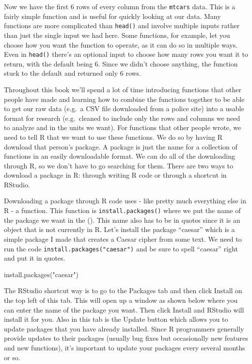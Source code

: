 \documentclass[
]{krantz}
\makeatletter
\newenvironment{Shaded}{\begin{snugshade}}{\end{snugshade}}
\newcommand{\FunctionTok}[1]{\textcolor[rgb]{0,0,0}{#1}}
\newcommand{\NormalTok}[1]{#1}
\newcommand{\StringTok}[1]{\textcolor[rgb]{0.5,0.5,0.5}{#1}}
\newenvironment{kframe}{%
\medskip{}
\setlength{\fboxsep}{.8em}
 \def\at@end@of@kframe{}%
 \ifinner\ifhmode%
  \def\at@end@of@kframe{\end{minipage}}%
  \begin{minipage}{\columnwidth}%
 \fi\fi%
 \def\FrameCommand##1{\hskip\@totalleftmargin \hskip-\fboxsep
 \colorbox{shadecolor}{##1}\hskip-\fboxsep
     \hskip-\linewidth \hskip-\@totalleftmargin \hskip\columnwidth}%
 \MakeFramed {\advance\hsize-\width
   \@totalleftmargin\z@ \linewidth\hsize
   \@setminipage}}%
 {\par\unskip\endMakeFramed%
 \at@end@of@kframe}
\renewenvironment{Shaded}{\begin{kframe}}{\end{kframe}}
\makeatother
\begin{document}
Now we have the first 6 rows of every column from the
\texttt{mtcars} data. This is a fairly simple function and
is useful for quickly looking at our data. Many functions
are more complicated than \texttt{head()} and involve
multiple inputs rather than just the single input we had
here. Some functions, for example, let you choose how you
want the function to operate, as it can do so in multiple
ways. Even in \texttt{head()} there's an optional input to
choose how many rows you want it to return, with the default
being 6. Since we didn't choose anything, the function stuck
to the default and returned only 6 rows.

Throughout this book we'll spend a lot of time introducing
functions that other people have made and learning how to
combine the functions together to be able to get our raw
data (e.g.~a CSV file downloaded from a police site) into a
usable format for research (e.g.~cleaned to include only the
rows and columns we need to analyze and in the units we
want). For functions that other people wrote, we need to
tell R that we want to use these functions. We do so by
having R download that person's package. A package is just
the name for a collection of functions in an easily
downloadable format. We can do all of the downloading
through R, so we don't have to go searching for them. There
are two ways to download a package in R: through writing R
code or through a shortcut in RStudio.

Downloading a package through R code uses - like pretty much
everything else in R - a function. This function is
\texttt{install.packages()} where we put the name of the
package we want in the (). This name also has to be in
quotes since it is an object that is not currently in R.
Let's install the package ``caesar'' which is a simple
package I made that creates a Caesar cipher from some text.
We need to run the code \texttt{install.packages("caesar")}
and be sure to spell ``caesar'' right and put it in quotes.

\begin{Shaded}
\begin{Highlighting}[]
\FunctionTok{install.packages}\NormalTok{(}\StringTok{"caesar"}\NormalTok{)}
\end{Highlighting}
\end{Shaded}

The RStudio shortcut way is to go to the Packages tab and
then click Install on the top left of this tab. This will
open up a window as shown below where you can enter the name
of the package you want. Then click Install and RStudio will
install it for you. Also in this tab is the Update button
which allows you to update packages that you have already
installed. Since R programmers generally provide updates to
their packages (usually bug fixes but occasionally new
features and new functions), it's important to update your
packages every several months or so.
\end{document}
